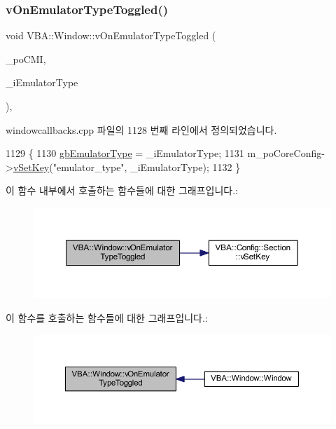 \subsubsection{\texorpdfstring{v\+On\+Emulator\+Type\+Toggled()}{vOnEmulatorTypeToggled()}}
{\footnotesize\ttfamily void V\+B\+A\+::\+Window\+::v\+On\+Emulator\+Type\+Toggled (\begin{DoxyParamCaption}\item[{Gtk\+::\+Check\+Menu\+Item $\ast$}]{\+\_\+po\+C\+MI,  }\item[{\mbox{\hyperlink{_util_8cpp_a0ef32aa8672df19503a49fab2d0c8071}{int}}}]{\+\_\+i\+Emulator\+Type }\end{DoxyParamCaption})\hspace{0.3cm}{\ttfamily [protected]}, {\ttfamily [virtual]}}



windowcallbacks.\+cpp 파일의 1128 번째 라인에서 정의되었습니다.


\begin{DoxyCode}
1129 \{
1130   \mbox{\hyperlink{gb_globals_8cpp_aab449ed6ecf2bd502928a3d5aa5c54c4}{gbEmulatorType}} = \_iEmulatorType;
1131   m\_poCoreConfig->\mbox{\hyperlink{class_v_b_a_1_1_config_1_1_section_a57e1b95cbea40db71c093381beff4b0e}{vSetKey}}(\textcolor{stringliteral}{"emulator\_type"}, \_iEmulatorType);
1132 \}
\end{DoxyCode}
이 함수 내부에서 호출하는 함수들에 대한 그래프입니다.\+:
\nopagebreak
\begin{figure}[H]
\begin{center}
\leavevmode
\includegraphics[width=350pt]{class_v_b_a_1_1_window_a223cab540dae446895699f2ca1494f8e_cgraph}
\end{center}
\end{figure}
이 함수를 호출하는 함수들에 대한 그래프입니다.\+:
\nopagebreak
\begin{figure}[H]
\begin{center}
\leavevmode
\includegraphics[width=350pt]{class_v_b_a_1_1_window_a223cab540dae446895699f2ca1494f8e_icgraph}
\end{center}
\end{figure}
\mbox{\label{class_v_b_a_1_1_window_a26d233092dd624a0bd3734ec0cdc0d7c}} 
